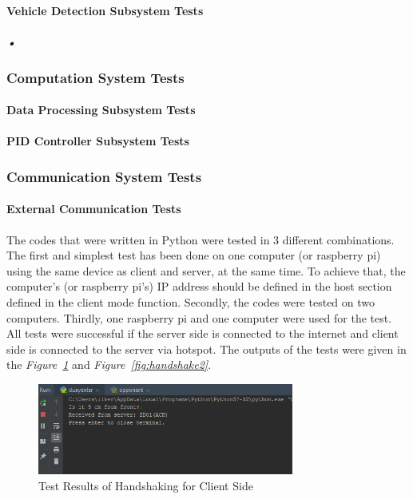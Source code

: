 \documentclass[a4paper,12pt]{article}
\begin{document}
	 
	 
	\paragraph{Vehicle Detection Subsystem Tests}
	
		\subparagraph{•}
		
	\subsubsection{Computation System Tests}
	
	\paragraph{Data Processing Subsystem Tests}	
		
	\paragraph{PID Controller Subsystem Tests}
	
	\subsubsection{Communication System Tests}
	
	\paragraph{External Communication Tests}
	
		The codes that were written in Python were tested in 3 different combinations. The first and simplest test has been done on one computer (or raspberry pi) using the same device as client and server, at the same time. To achieve that, the computer’s (or raspberry pi’s) IP address should be defined in the host section defined in the client mode function. Secondly, the codes were tested on two computers. Thirdly, one raspberry pi and one computer were used for the test. All tests were successful if the server side is connected to the internet and client side is connected to the server via hotspot. The outputs of the tests were given in the \textit{Figure~\ref{fig:handshake1}} and \textit{Figure~\ref{fig:handshake2}}.
		
		
		
		\begin{figure}[H]
				\center
				\setlength{\unitlength}{\textwidth} 
				\includegraphics[width=0.75\textwidth]{images/handshake1}
				\caption{\label{fig:handshake1}Test Results of Handshaking for Client Side}
		\end{figure}
\end{document}
